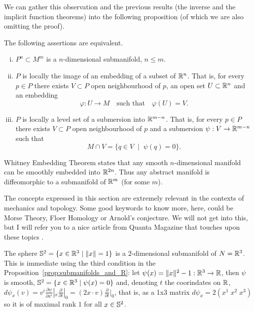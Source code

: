 We can gather this observation and the previous results (the inverse and the implicit function theorems) into the following proposition (of which we are also omitting the proof).

\begin{proposition}\label{prop:submanifolds_and_R}
  The following assertions are equivalent.
  \begin{enumerate}[(i)]
    \item $P^n\subset M^m$ is a $n$-dimensional submanifold, $n \leq m$.
    \item $P$ is locally the image of an embedding of a subset of $\mathbb{R}^n$.
          That is, for every $p\in P$ there exists $V\subset P$ open neighbourhood of $p$, an open set $U\subset\mathbb{R}^n$ and an embedding
          \begin{equation}
            \varphi : U \to M \quad\mbox{such that}\quad \varphi(U)=V.
          \end{equation}
    \item $P$ is locally a level set of a submersion into $\mathbb{R}^{m-n}$.
          That is, for every $p\in P$ there exists $V\subset P$ open neighbourhood of $p$ and a submersion $\psi: V \to\mathbb{R}^{m-n}$ such that
          \begin{equation}
            M\cap V = \{q\in V \;\mid\; \psi(q) = 0\}.
          \end{equation}
  \end{enumerate}
\end{proposition}

\begin{remark}\label{rmk:WhitneyET}
  Whitney Embedding Theorem states that any smooth $n$-dimensional manifold can be smoothly embedded into $\mathbb{R}^{2n}$.
  Thus any abstract manifold is diffeomorphic to a submanifold of $\mathbb{R}^m$ (for some $m$).
\end{remark}

\begin{remark}
  The concepts expressed in this section are extremely relevant in the contexts of mechanics and topology.
  Some good keywords to know more, here, could be Morse Theory, Floer Homology or Arnold's conjecture.
  We will not get into this, but I will refer you to a nice article from Quanta Magazine that touches upon these topics \cite{article:quanta:floer}.
\end{remark}

\begin{example}\label{ex:s2}
  The sphere $\mathbb{S}^2 = \{x\in\mathbb{R}^3 \mid \|x\| = 1\}$ is a $2$-dimensional submanifold of $N=\mathbb{R}^3$.
  This is immediate using the third condition in the Proposition~\ref{prop:submanifolds_and_R}: let $\psi(x) = \|x\|^2 -1 : \mathbb{R}^3 \to \mathbb{R}$, then $\psi$ is smooth, $\mathbb{S}^2 = \{x\in\mathbb{R}^3\mid\psi(x)=0\}$ and, denoting $t$ the coorindates on $\mathbb{R}$, $d\psi_x(v)= v^i \frac{\partial \psi}{\partial x^i}|_x \frac{\partial}{\partial t}|_0 = (2x\cdot v) \frac{\partial}{\partial t}|_0$, that is, as a 1x3 matrix $d\psi_x = 2(x^1\; x^2\; x^3)$ so it is of maximal rank $1$ for all $x\in\mathbb{S}^2$.
\end{example}

